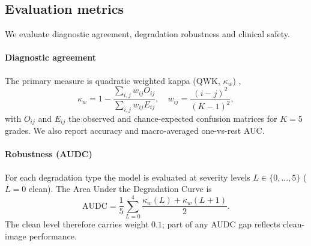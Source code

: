 \documentclass[final,5p,times,twocolumn,authoryear]{elsarticle}
\theoremstyle{plain}
\theoremstyle{remark}
\begin{document}
\subsection{Evaluation metrics}
\label{sec:metrics}

We evaluate diagnostic agreement, degradation robustness and clinical safety.

\paragraph{Diagnostic agreement} The primary measure is quadratic weighted kappa (QWK, $\kappa_w$) \citep{Cohen1968kappa},
\begin{equation}
  \kappa_w = 1 - \frac{\sum_{i,j} w_{ij} O_{ij}}{\sum_{i,j} w_{ij} E_{ij}}, \quad w_{ij} = \frac{(i - j)^2}{(K - 1)^2},
  \label{eq:qwk}
\end{equation}
with $O_{ij}$ and $E_{ij}$ the observed and chance-expected confusion matrices for $K=5$ grades. We also report accuracy and macro-averaged one-vs-rest AUC.

\paragraph{Robustness (AUDC)} For each degradation type the model is evaluated at severity levels $L \in \{0,\dots,5\}$ ($L=0$ clean). The Area Under the Degradation Curve is
\begin{equation}
  \text{AUDC} = \frac{1}{5} \sum_{L=0}^4 \frac{\kappa_w(L) + \kappa_w(L+1)}{2}.
  \label{eq:audc}
\end{equation}
The clean level therefore carries weight $0.1$; part of any AUDC gap reflects clean-image performance.
\end{document}

